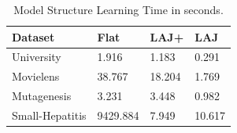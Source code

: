 \documentclass{article}
\begin{document}
\begin{table} \centering
\begin{tabular}[c]
{|l|l|l|l|}\hline
 \textbf{Dataset} & \textbf{Flat} & \textbf{LAJ+} & \textbf{LAJ}\\\hline
University&1.916&1.183&0.291 \\\hline
Movielens &38.767& 18.204& 1.769\\\hline
Mutagenesis &3.231& 3.448& 0.982\\\hline
Small-Hepatitis &9429.884&7.949&10.617 \\\hline
\end{tabular}
\caption{Model Structure Learning Time  in seconds.
 \label{table:runtimes}}
\end{table}

%
%
%
\end{document}
